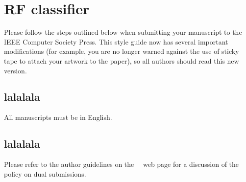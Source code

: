 \section{RF classifier}
\label{sec:intro}

Please follow the steps outlined below when submitting your manuscript to the IEEE Computer Society Press.
This style guide now has several important modifications (for example, you are no longer warned against the use of sticky tape to attach your artwork to the paper), so all authors should read this new version.

\subsection{lalalala}

All manuscripts must be in English.

\subsection{lalalala}

Please refer to the author guidelines on the \confName\ \confYear\ web page for a
discussion of the policy on dual submissions.